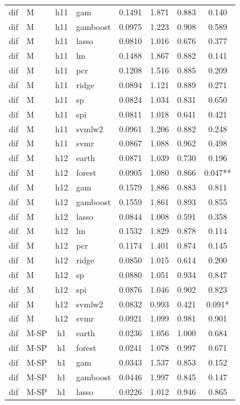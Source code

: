 \begin{ThreePartTable}
\begin{longtable}[t]{llclcccc}
dif & M & h11 & gam & 0.1491 & 1.871 & 0.883 & 0.140\\
dif & M & h11 & gamboost & 0.0975 & 1.223 & 0.908 & 0.589\\
dif & M & h11 & lasso & 0.0810 & 1.016 & 0.676 & 0.377\\
dif & M & h11 & lm & 0.1488 & 1.867 & 0.882 & 0.141\\
dif & M & h11 & pcr & 0.1208 & 1.516 & 0.885 & 0.209\\
dif & M & h11 & ridge & 0.0894 & 1.121 & 0.889 & 0.271\\
dif & M & h11 & sp & 0.0824 & 1.034 & 0.831 & 0.650\\
dif & M & h11 & spi & 0.0811 & 1.018 & 0.641 & 0.421\\
dif & M & h11 & svmlw2 & 0.0961 & 1.206 & 0.882 & 0.248\\
dif & M & h11 & svmr & 0.0867 & 1.088 & 0.962 & 0.498\\
\addlinespace
dif & M & h12 & earth & 0.0871 & 1.039 & 0.730 & 0.196\\
dif & M & h12 & forest & 0.0905 & 1.080 & 0.866 & 0.047**\\
dif & M & h12 & gam & 0.1579 & 1.886 & 0.883 & 0.811\\
dif & M & h12 & gamboost & 0.1559 & 1.861 & 0.893 & 0.855\\
dif & M & h12 & lasso & 0.0844 & 1.008 & 0.591 & 0.358\\
dif & M & h12 & lm & 0.1532 & 1.829 & 0.878 & 0.114\\
dif & M & h12 & pcr & 0.1174 & 1.401 & 0.874 & 0.145\\
dif & M & h12 & ridge & 0.0850 & 1.015 & 0.614 & 0.200\\
dif & M & h12 & sp & 0.0880 & 1.051 & 0.934 & 0.847\\
dif & M & h12 & spi & 0.0876 & 1.046 & 0.902 & 0.823\\
dif & M & h12 & svmlw2 & 0.0832 & 0.993 & 0.421 & 0.091*\\
dif & M & h12 & svmr & 0.0921 & 1.099 & 0.981 & 0.901\\
\addlinespace
dif & M-SP & h1 & earth & 0.0236 & 1.056 & 1.000 & 0.684\\
dif & M-SP & h1 & forest & 0.0241 & 1.078 & 0.997 & 0.671\\
dif & M-SP & h1 & gam & 0.0343 & 1.537 & 0.853 & 0.152\\
dif & M-SP & h1 & gamboost & 0.0446 & 1.997 & 0.845 & 0.147\\
dif & M-SP & h1 & lasso & 0.0226 & 1.012 & 0.946 & 0.865\\

\end{longtable}
\end{ThreePartTable}
